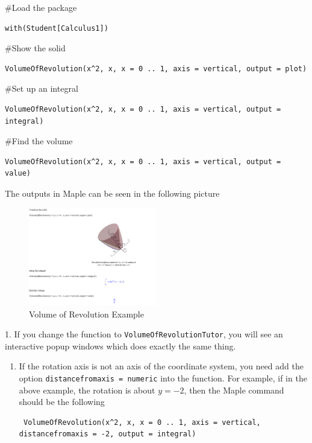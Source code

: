 \documentclass[en,11pt,simple]{elegantbook}
\let\BeginKnitrBlock\begin \let\EndKnitrBlock\end
\begin{document}
\BeginKnitrBlock{solution}{}{}
{}

\#Load the package

\begin{verbatim}
with(Student[Calculus1])
\end{verbatim}

\#Show the solid

\begin{verbatim}
VolumeOfRevolution(x^2, x, x = 0 .. 1, axis = vertical, output = plot)
\end{verbatim}

\#Set up an integral

\begin{verbatim}
VolumeOfRevolution(x^2, x, x = 0 .. 1, axis = vertical, output = integral)
\end{verbatim}

\#Find the volume

\begin{verbatim}
VolumeOfRevolution(x^2, x, x = 0 .. 1, axis = vertical, output = value)
\end{verbatim}

The outputs in Maple can be seen in the following picture

\begin{figure}
\centering
\includegraphics[width=0.5\textwidth,height=\textheight]{figs/VolOfRev-Example1.png}
\caption{Volume of Revolution Example}
\end{figure}
\EndKnitrBlock{solution}

\BeginKnitrBlock{remark}{}{}
{}1. If you change the function to \texttt{VolumeOfRevolutionTutor}, you will see an interactive popup windows which does exactly the same thing.

\begin{enumerate}
\def\labelenumi{\arabic{enumi}.}
\setcounter{enumi}{1}
\item
  If the rotation axis is not an axis of the coordinate system, you need add the option \texttt{distancefromaxis\ =\ numeric} into the function. For example, if in the above example, the rotation is about \(y=-2\), then the Maple command should be the following

\begin{verbatim}
 VolumeOfRevolution(x^2, x, x = 0 .. 1, axis = vertical, distancefromaxis = -2, output = integral)
\end{verbatim}
\end{enumerate}
\EndKnitrBlock{remark}
\end{document}
